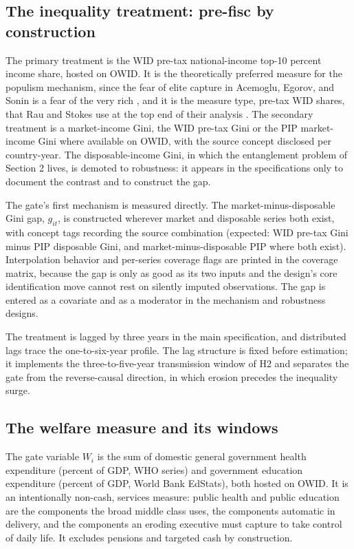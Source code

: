 \documentclass[11pt,letterpaper]{article}
\begin{document}
\subsection{The inequality treatment: pre-fisc by construction}

The primary treatment is the WID pre-tax national-income top-10 percent income share, hosted on OWID. It is the theoretically preferred measure for the populism mechanism, since the fear of elite capture in Acemoglu, Egorov, and Sonin is a fear of the very rich \citep{AcemogluEgorov2013}, and it is the measure type, pre-tax WID shares, that Rau and Stokes use at the top end of their analysis \citep{RauStokes2025}. The secondary treatment is a market-income Gini, the WID pre-tax Gini or the PIP market-income Gini where available on OWID, with the source concept disclosed per country-year. The disposable-income Gini, in which the entanglement problem of Section 2 lives, is demoted to robustness: it appears in the specifications only to document the contrast and to construct the gap.

The gate's first mechanism is measured directly. The market-minus-disposable Gini gap, $g_{it}$, is constructed wherever market and disposable series both exist, with concept tags recording the source combination (expected: WID pre-tax Gini minus PIP disposable Gini, and market-minus-disposable PIP where both exist). Interpolation behavior and per-series coverage flags are printed in the coverage matrix, because the gap is only as good as its two inputs and the design's core identification move cannot rest on silently imputed observations. The gap is entered as a covariate and as a moderator in the mechanism and robustness designs.

The treatment is lagged by three years in the main specification, and distributed lags trace the one-to-six-year profile. The lag structure is fixed before estimation; it implements the three-to-five-year transmission window of H2 and separates the gate from the reverse-causal direction, in which erosion precedes the inequality surge.

\subsection{The welfare measure and its windows}

The gate variable $W_i$ is the sum of domestic general government health expenditure (percent of GDP, WHO series) and government education expenditure (percent of GDP, World Bank EdStats), both hosted on OWID. It is an intentionally non-cash, services measure: public health and public education are the components the broad middle class uses, the components automatic in delivery, and the components an eroding executive must capture to take control of daily life. It excludes pensions and targeted cash by construction.
\end{document}
